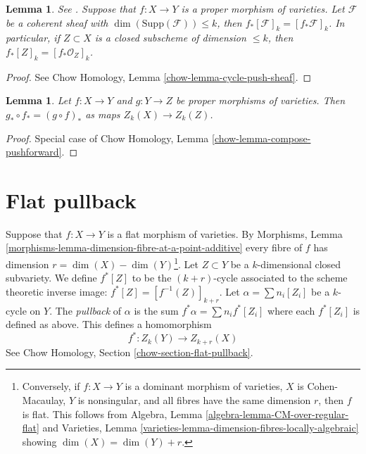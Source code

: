 \documentclass{stacks-project}
\newenvironment{reference}{\comment}{\endcomment}
\theoremstyle{plain}
\newtheorem{lemma}[subsection]{Lemma}
\theoremstyle{definition}
\theoremstyle{remark}
\numberwithin{equation}{subsection}
\begin{document}
\begin{lemma}
\label{lemma-push-coherent}
\begin{reference}
See \cite[Chapter V]{Serre_algebre_locale}.
\end{reference}
Suppose that $f : X \to Y$ is a proper morphism of varieties.
Let $\mathcal{F}$ be a coherent sheaf with
$\dim(\text{Supp}(\mathcal{F})) \leq k$, then
$f_*[\mathcal{F}]_k = [f_*\mathcal{F}]_k$. In particular, if
$Z \subset X$ is a closed subscheme of dimension $\leq k$, then
$f_*[Z]_k = [f_*\mathcal{O}_Z]_k$.
\end{lemma}

\begin{proof}
See Chow Homology, Lemma \ref{chow-lemma-cycle-push-sheaf}.
\end{proof}

\begin{lemma}
\label{lemma-compose-pushforward}
Let $f : X \to Y$ and $g : Y \to Z$ be proper morphisms of
varieties. Then $g_* \circ f_* = (g \circ f)_*$ as maps $Z_k(X) \to Z_k(Z)$.
\end{lemma}

\begin{proof}
Special case of Chow Homology, Lemma \ref{chow-lemma-compose-pushforward}.
\end{proof}



\section{Flat pullback}
\label{section-flat-pullback}

\noindent
Suppose that $f : X \to Y$ is a flat morphism of varieties.
By Morphisms, Lemma
\ref{morphisms-lemma-dimension-fibre-at-a-point-additive} 
every fibre of $f$ has dimension $r = \dim(X) - \dim(Y)$\footnote{Conversely,
if $f : X \to Y$ is a dominant morphism of varieties,
$X$ is Cohen-Macaulay, $Y$ is nonsingular, and all fibres have
the same dimension $r$, then $f$ is flat. This follows from
Algebra, Lemma \ref{algebra-lemma-CM-over-regular-flat} and
Varieties, Lemma \ref{varieties-lemma-dimension-fibres-locally-algebraic}
showing $\dim(X) = \dim(Y) + r$.}.
Let $Z \subset Y$ be a $k$-dimensional closed subvariety. We define
$f^*[Z]$ to be the $(k + r)$-cycle associated to the scheme theoretic
inverse image: $f^*[Z] = [f^{-1}(Z)]_{k + r}$. Let
$\alpha = \sum n_i [Z_i]$ be a $k$-cycle on $Y$. The {\it pullback} of
$\alpha$ is the sum $f^* \alpha = \sum n_i f^*[Z_i]$ where each $f^*[Z_i]$
is defined as above. This defines a homomorphism
$$
f^* : Z_k(Y) \longrightarrow Z_{k + r}(X)
$$
See Chow Homology, Section \ref{chow-section-flat-pullback}.
\end{document}
